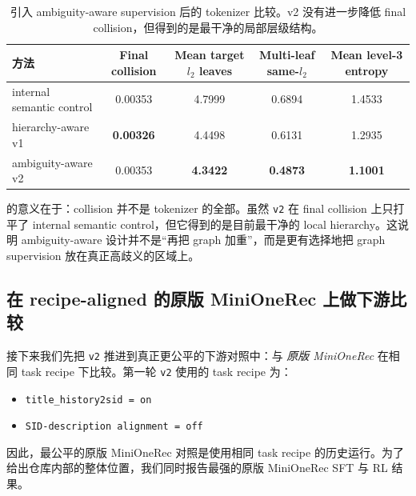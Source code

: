 \begin{table}[t]
  \centering
  \caption{引入 ambiguity-aware supervision 后的 tokenizer 比较。v2 没有进一步降低 final collision，但得到的是最干净的局部层级结构。}
  \label{tab:v2tok}
  \begin{tabular}{lcccc}
    \toprule
    方法 & Final collision & Mean target $l_2$ leaves & Multi-leaf same-$l_2$ & Mean level-3 entropy \\
    \midrule
    internal semantic control & 0.00353 & 4.7999 & 0.6894 & 1.4533 \\
    hierarchy-aware v1 & \textbf{0.00326} & 4.4498 & 0.6131 & 1.2935 \\
    ambiguity-aware v2 & 0.00353 & \textbf{4.3422} & \textbf{0.4873} & \textbf{1.1001} \\
    \bottomrule
  \end{tabular}
\end{table}

 的意义在于：collision 并不是 tokenizer 的全部。虽然 \texttt{v2} 在 final collision 上只打平了 internal semantic control，但它得到的是目前最干净的 local hierarchy。这说明 ambiguity-aware 设计并不是“再把 graph 加重”，而是更有选择地把 graph supervision 放在真正高歧义的区域上。

\subsection{在 recipe-aligned 的原版 MiniOneRec 上做下游比较}

接下来我们先把 \texttt{v2} 推进到真正更公平的下游对照中：与 \emph{原版 MiniOneRec} 在相同 task recipe 下比较。第一轮 \texttt{v2} 使用的 task recipe 为：
\begin{itemize}[leftmargin=1.4em]
  \item \texttt{title\_history2sid = on}
  \item \texttt{SID-description alignment = off}
\end{itemize}

因此，最公平的原版 MiniOneRec 对照是使用相同 task recipe 的历史运行。为了给出仓库内部的整体位置，我们同时报告最强的原版 MiniOneRec SFT 与 RL 结果。

